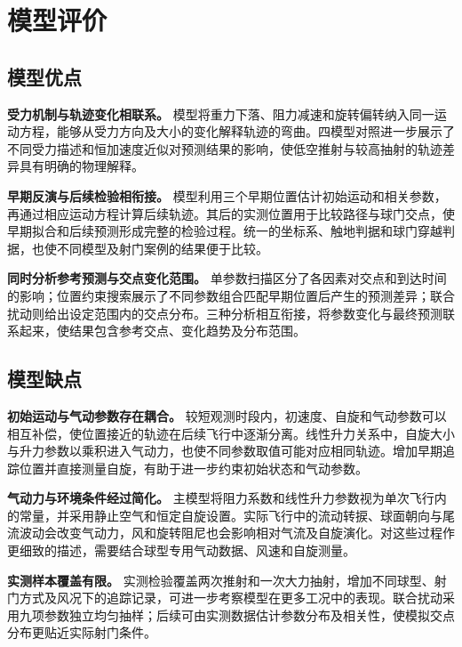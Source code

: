 \documentclass[12pt,letterpaper]{article}
\begin{document}
\setcounter{section}{7}
\section{模型评价}

\subsection{模型优点}

\textbf{受力机制与轨迹变化相联系。} 模型将重力下落、阻力减速和旋转偏转纳入同一运动方程，能够从受力方向及大小的变化解释轨迹的弯曲。四模型对照进一步展示了不同受力描述和恒加速度近似对预测结果的影响，使低空推射与较高抽射的轨迹差异具有明确的物理解释。

\textbf{早期反演与后续检验相衔接。} 模型利用三个早期位置估计初始运动和相关参数，再通过相应运动方程计算后续轨迹。其后的实测位置用于比较路径与球门交点，使早期拟合和后续预测形成完整的检验过程。统一的坐标系、触地判据和球门穿越判据，也使不同模型及射门案例的结果便于比较。

\textbf{同时分析参考预测与交点变化范围。} 单参数扫描区分了各因素对交点和到达时间的影响；位置约束搜索展示了不同参数组合匹配早期位置后产生的预测差异；联合扰动则给出设定范围内的交点分布。三种分析相互衔接，将参数变化与最终预测联系起来，使结果包含参考交点、变化趋势及分布范围。

\subsection{模型缺点}

\textbf{初始运动与气动参数存在耦合。} 较短观测时段内，初速度、自旋和气动参数可以相互补偿，使位置接近的轨迹在后续飞行中逐渐分离。线性升力关系中，自旋大小与升力参数以乘积进入气动力，也使不同参数取值可能对应相同轨迹。增加早期追踪位置并直接测量自旋，有助于进一步约束初始状态和气动参数。

\textbf{气动力与环境条件经过简化。} 主模型将阻力系数和线性升力参数视为单次飞行内的常量，并采用静止空气和恒定自旋设置。实际飞行中的流动转捩、球面朝向与尾流波动会改变气动力，风和旋转阻尼也会影响相对气流及自旋演化。对这些过程作更细致的描述，需要结合球型专用气动数据、风速和自旋测量。

\textbf{实测样本覆盖有限。} 实测检验覆盖两次推射和一次大力抽射，增加不同球型、射门方式及风况下的追踪记录，可进一步考察模型在更多工况中的表现。联合扰动采用九项参数独立均匀抽样；后续可由实测数据估计参数分布及相关性，使模拟交点分布更贴近实际射门条件。
\end{document}
